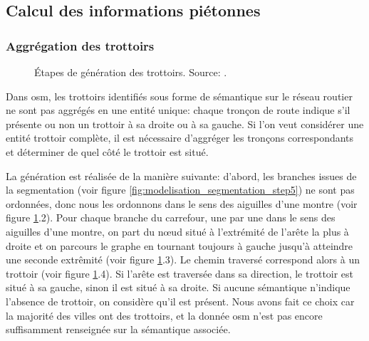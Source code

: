 \subsection{Calcul des informations piétonnes}

\subsubsection{Aggrégation des trottoirs}

\begin{figure}
    \centering
    \caption{Étapes de génération des trottoirs. Source: \cite{Kalsron2022}.}
    \label{fig:modelisation_calcul_pieton_trottoirs}
\end{figure}

Dans \gls{osm}, les trottoirs identifiés sous forme de sémantique sur le réseau routier ne sont pas aggrégés en une entité unique: chaque tronçon de route indique s'il présente ou non un trottoir à sa droite ou à sa gauche. Si l'on veut considérer une entité trottoir complète, il est nécessaire d'aggréger les tronçons correspondants et déterminer de quel côté le trottoir est situé.

La génération est réalisée de la manière suivante: d'abord, les branches issues de la segmentation (voir figure \ref{fig:modelisation_segmentation_step5}) ne sont pas ordonnées, donc nous les ordonnons dans le sens des aiguilles d'une montre (voir figure \ref{fig:modelisation_calcul_pieton_trottoirs}.2). Pour chaque branche du carrefour, une par une dans le sens des aiguilles d'une montre, on part du nœud situé à l'extrémité de l'arête la plus à droite et on parcours le graphe en tournant toujours à gauche jusqu'à atteindre une seconde extrêmité (voir figure \ref{fig:modelisation_calcul_pieton_trottoirs}.3). Le chemin traversé correspond alors à un trottoir (voir figure \ref{fig:modelisation_calcul_pieton_trottoirs}.4). Si l'arête est traversée dans sa direction, le trottoir est situé à sa gauche, sinon il est situé à sa droite. Si aucune sémantique n'indique l'absence de trottoir, on considère qu'il est présent. Nous avons fait ce choix car la majorité des villes ont des trottoirs, et la donnée \gls{osm} n'est pas encore suffisamment renseignée sur la sémantique associée.


